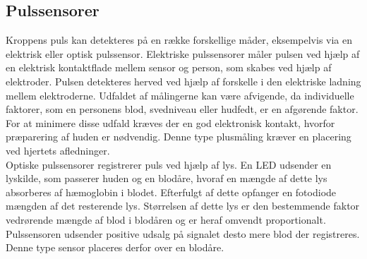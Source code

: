 \subsection{Pulssensorer}\label{sec:pulssensor}
Kroppens puls kan detekteres på en række forskellige måder, eksempelvis via en elektrisk eller optisk pulssensor. Elektriske pulssensorer måler pulsen ved hjælp af en elektrisk kontaktflade mellem sensor og person, som skabes ved hjælp af elektroder. Pulsen detekteres herved ved hjælp af forskelle i den elektriske ladning mellem elektroderne. Udfaldet af målingerne kan være afvigende, da individuelle faktorer, som en personens blod, svedniveau eller hudfedt, er en afgørende faktor. For at minimere disse udfald kræves der en god elektronisk kontakt, hvorfor præparering af huden er nødvendig. Denne type plusmåling kræver en placering ved hjertets afledninger. \citep{PhuaLissorguesMercier2009}  \\
Optiske pulssensorer registrerer puls ved hjælp af lys. En LED udsender en lyskilde, som passerer huden og en blodåre, hvoraf en mængde af dette lys absorberes af hæmoglobin i blodet. Efterfulgt af dette opfanger en fotodiode mængden af det resterende lys. Størrelsen af dette lys er den bestemmende faktor vedrørende mængde af blod i blodåren og er heraf omvendt proportionalt. Pulssensoren udsender positive udsalg på signalet desto mere blod der registreres. Denne type sensor placeres derfor over en blodåre. \citep{PhuaLissorguesMercier2009,SrinivasReddySrinivas2006} 

